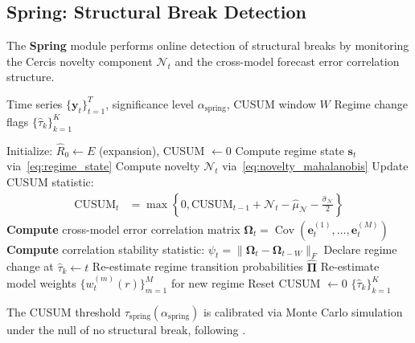\documentclass[12pt,a4paper]{article}
\DeclareMathOperator{\Cov}{Cov}
\begin{document}
\subsection{Spring: Structural Break Detection}

The \textbf{Spring} module performs online detection of structural
breaks by monitoring the Cercis novelty component $\mathcal{N}_t$
and the cross-model forecast error correlation structure.

\begin{algorithm}[htbp]
\caption{Spring Structural Break Detection}
\label{alg:spring}
\begin{algorithmic}[1]
\Require Time series $\{\mathbf{y}_t\}_{t=1}^{T}$,
         significance level $\alpha_{\text{spring}}$,
         CUSUM window $W$
\Ensure Regime change flags $\{\hat{\tau}_k\}_{k=1}^{K}$

\State Initialize: $\hat{R}_0 \gets E$ (expansion), CUSUM $\gets 0$
    \State Compute regime state $\mathbf{s}_t$ via~\eqref{eq:regime_state}
    \State Compute novelty $\mathcal{N}_t$ via~\eqref{eq:novelty_mahalanobis}
    \State Update CUSUM statistic:
    \begin{align}
        \text{CUSUM}_t &=
        \max\left\{0, \text{CUSUM}_{t-1} + \mathcal{N}_t -
        \hat{\mu}_{\mathcal{N}} - \frac{\hat{\sigma}_{\mathcal{N}}}{2}
        \right\}
    \end{align}
    \State \textbf{Compute} cross-model error correlation matrix
        $\mathbf{\Omega}_t = \Cov(\mathbf{e}_t^{(1)}, \ldots,
        \mathbf{e}_t^{(M)})$
    \State \textbf{Compute} correlation stability statistic:
        $\psi_t = \|\mathbf{\Omega}_t - \mathbf{\Omega}_{t-W}\|_F$
        \State Declare regime change at $\hat{\tau}_k \gets t$
        \State Re-estimate regime transition probabilities
            $\hat{\mathbf{\Pi}}$
        \State Re-estimate model weights
            $\{w_t^{(m)}(r)\}_{m=1}^{M}$ for new regime
        \State Reset CUSUM $\gets 0$
    \EndIf
\EndFor
\State \Return $\{\hat{\tau}_k\}_{k=1}^{K}$
\end{algorithmic}
\end{algorithm}

The CUSUM threshold $\tau_{\text{spring}}(\alpha_{\text{spring}})$
is calibrated via Monte Carlo simulation under the null of no
structural break, following \citet{andrews1993tests}.
\end{document}
